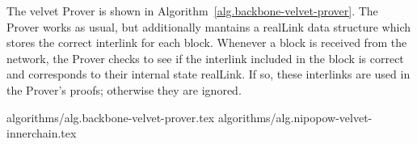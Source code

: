 The velvet Prover is shown in Algorithm~\ref{alg.backbone-velvet-prover}. The
Prover works as usual, but additionally mantains a realLink data structure
which stores the correct interlink for each block. Whenever a block is received
from the network, the Prover checks to see if the interlink included in the block is
correct and corresponds to their internal state realLink. If so, these
interlinks are used in the Prover's proofs; otherwise they are ignored.

{algorithms/alg.backbone-velvet-prover.tex}
{algorithms/alg.nipopow-velvet-innerchain.tex}
